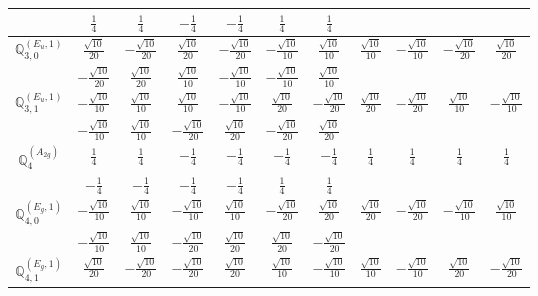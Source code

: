\documentclass[fleqn,10pt,landscape]{article}
\begin{document}
\begin{itemize}
{\begin{center}
\begin{longtable}{ccccccccccc}
& $ \frac{1}{4} $ & $ \frac{1}{4} $ & $ - \frac{1}{4} $ & $ - \frac{1}{4} $ & $ \frac{1}{4} $ & $ \frac{1}{4} $ & $  $ & $  $ & $  $ & $  $ \\ \hline
$\mathbb{Q}_{3,0}^{(E_{u},1)}$ & $ \frac{\sqrt{10}}{20} $ & $ - \frac{\sqrt{10}}{20} $ & $ \frac{\sqrt{10}}{20} $ & $ - \frac{\sqrt{10}}{20} $ & $ - \frac{\sqrt{10}}{10} $ & $ \frac{\sqrt{10}}{10} $ & $ \frac{\sqrt{10}}{10} $ & $ - \frac{\sqrt{10}}{10} $ & $ - \frac{\sqrt{10}}{20} $ & $ \frac{\sqrt{10}}{20} $ \\
& $ - \frac{\sqrt{10}}{20} $ & $ \frac{\sqrt{10}}{20} $ & $ \frac{\sqrt{10}}{10} $ & $ - \frac{\sqrt{10}}{10} $ & $ - \frac{\sqrt{10}}{10} $ & $ \frac{\sqrt{10}}{10} $ & $  $ & $  $ & $  $ & $  $ \\ \hline
$\mathbb{Q}_{3,1}^{(E_{u},1)}$ & $ - \frac{\sqrt{10}}{10} $ & $ \frac{\sqrt{10}}{10} $ & $ \frac{\sqrt{10}}{10} $ & $ - \frac{\sqrt{10}}{10} $ & $ \frac{\sqrt{10}}{20} $ & $ - \frac{\sqrt{10}}{20} $ & $ \frac{\sqrt{10}}{20} $ & $ - \frac{\sqrt{10}}{20} $ & $ \frac{\sqrt{10}}{10} $ & $ - \frac{\sqrt{10}}{10} $ \\
& $ - \frac{\sqrt{10}}{10} $ & $ \frac{\sqrt{10}}{10} $ & $ - \frac{\sqrt{10}}{20} $ & $ \frac{\sqrt{10}}{20} $ & $ - \frac{\sqrt{10}}{20} $ & $ \frac{\sqrt{10}}{20} $ & $  $ & $  $ & $  $ & $  $ \\ \hline
$\mathbb{Q}_{4}^{(A_{2g})}$ & $ \frac{1}{4} $ & $ \frac{1}{4} $ & $ - \frac{1}{4} $ & $ - \frac{1}{4} $ & $ - \frac{1}{4} $ & $ - \frac{1}{4} $ & $ \frac{1}{4} $ & $ \frac{1}{4} $ & $ \frac{1}{4} $ & $ \frac{1}{4} $ \\
& $ - \frac{1}{4} $ & $ - \frac{1}{4} $ & $ - \frac{1}{4} $ & $ - \frac{1}{4} $ & $ \frac{1}{4} $ & $ \frac{1}{4} $ & $  $ & $  $ & $  $ & $  $ \\ \hline
$\mathbb{Q}_{4,0}^{(E_{g},1)}$ & $ - \frac{\sqrt{10}}{10} $ & $ \frac{\sqrt{10}}{10} $ & $ - \frac{\sqrt{10}}{10} $ & $ \frac{\sqrt{10}}{10} $ & $ - \frac{\sqrt{10}}{20} $ & $ \frac{\sqrt{10}}{20} $ & $ \frac{\sqrt{10}}{20} $ & $ - \frac{\sqrt{10}}{20} $ & $ - \frac{\sqrt{10}}{10} $ & $ \frac{\sqrt{10}}{10} $ \\
& $ - \frac{\sqrt{10}}{10} $ & $ \frac{\sqrt{10}}{10} $ & $ - \frac{\sqrt{10}}{20} $ & $ \frac{\sqrt{10}}{20} $ & $ \frac{\sqrt{10}}{20} $ & $ - \frac{\sqrt{10}}{20} $ & $  $ & $  $ & $  $ & $  $ \\ \hline
$\mathbb{Q}_{4,1}^{(E_{g},1)}$ & $ \frac{\sqrt{10}}{20} $ & $ - \frac{\sqrt{10}}{20} $ & $ - \frac{\sqrt{10}}{20} $ & $ \frac{\sqrt{10}}{20} $ & $ \frac{\sqrt{10}}{10} $ & $ - \frac{\sqrt{10}}{10} $ & $ \frac{\sqrt{10}}{10} $ & $ - \frac{\sqrt{10}}{10} $ & $ \frac{\sqrt{10}}{20} $ & $ - \frac{\sqrt{10}}{20} $ \\

\end{longtable}
\end{center}}
\end{itemize}
\end{document}
